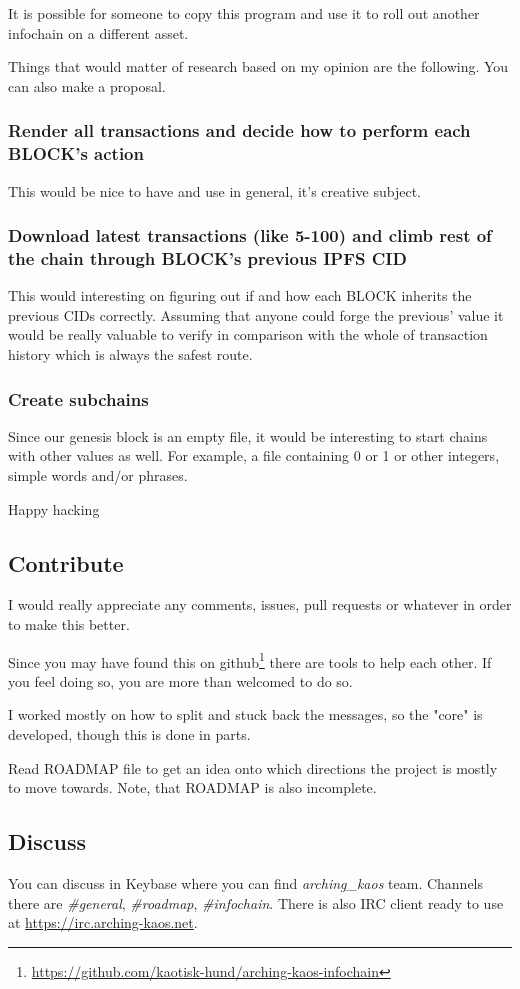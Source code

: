 \documentclass[10pt,a4paper,twocolumn]{paper}
\begin{document}
It is possible for someone to copy this program and use it to roll out another infochain on a different asset.

Things that would matter of research based on my opinion are the following. You can also make a proposal.

\subsubsection{Render all transactions and decide how to perform each BLOCK's action}
	This would be nice to have and use in general, it's creative subject.
	
\subsubsection{Download latest transactions (like 5-100) and climb rest of the chain through BLOCK's previous IPFS CID}
 This would interesting on
	figuring out if and how each BLOCK inherits the previous CIDs
	correctly. Assuming that anyone could forge the previous' value it
	would be really valuable to verify in comparison with the whole of
	transaction history which is always the safest route.
	
\subsubsection{Create subchains}
 Since our genesis block is an empty file, it would be
	interesting to start chains with other values as well. For example, a
	file containing 0 or 1 or other integers, simple words and/or phrases.


Happy hacking


	\subsection{Contribute}\label{contribute}

I would really appreciate any comments, issues, pull requests or whatever in order to make this better.

Since you may have found this on github\footnote{\url{https://github.com/kaotisk-hund/arching-kaos-infochain}} there are tools to help each other. If you feel doing so, you are more than welcomed to do so.

I worked mostly on how to split and stuck back the messages, so the "core" is developed, though this is done in parts.

Read ROADMAP file to get an idea onto which directions the project is mostly to move towards. Note, that ROADMAP is also incomplete.

\subsection{Discuss}
You can discuss in Keybase where you can find \textit{arching\_kaos} team.
Channels there are \textit{\#general}, \textit{\#roadmap}, \textit{\#infochain}. There is also IRC
client ready to use at \url{https://irc.arching-kaos.net}.
\end{document}
